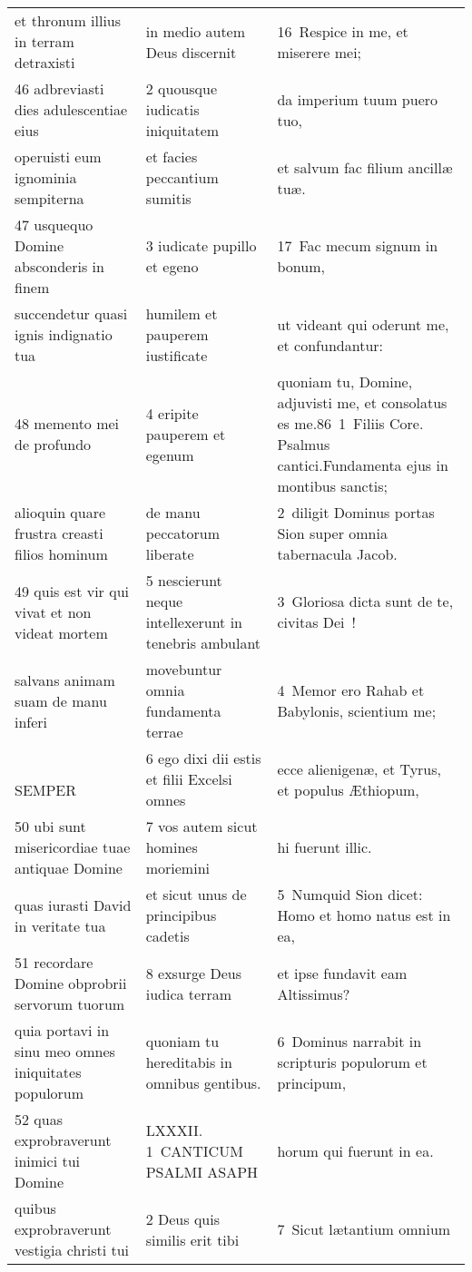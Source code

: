 \documentclass{article}
\begin{document}
\begin{longtable}{@{}p{}p{}p{}@{}}
et thronum illius in terram detraxisti	&	in medio autem Deus discernit	&	16 Respice in me, et miserere mei;	\\
46 adbreviasti dies adulescentiae eius	&	2 quousque iudicatis iniquitatem	&	da imperium tuum puero tuo,	\\
operuisti eum ignominia sempiterna	&	et facies peccantium sumitis	&	et salvum fac filium ancillæ tuæ.	\\
47 usquequo Domine absconderis in finem	&	3 iudicate pupillo et egeno	&	17 Fac mecum signum in bonum,	\\
succendetur quasi ignis indignatio tua	&	humilem et pauperem iustificate	&	ut videant qui oderunt me, et confundantur:	\\
48 memento mei de profundo	&	4 eripite pauperem et egenum	&	quoniam tu, Domine, adjuvisti me, et consolatus es me.86 1 Filiis Core. Psalmus cantici.Fundamenta ejus in montibus sanctis;	\\
alioquin quare frustra creasti filios hominum	&	de manu peccatorum liberate	&	2 diligit Dominus portas Sion super omnia tabernacula Jacob.	\\
49 quis est vir qui vivat et non videat mortem	&	5 nescierunt neque intellexerunt in tenebris ambulant	&	3 Gloriosa dicta sunt de te, civitas Dei !	\\
salvans animam suam de manu inferi	&	movebuntur omnia fundamenta terrae	&	4 Memor ero Rahab et Babylonis, scientium me;	\\
    SEMPER	&	6 ego dixi dii estis et filii Excelsi omnes	&	ecce alienigenæ, et Tyrus, et populus Æthiopum,	\\
50 ubi sunt misericordiae tuae antiquae Domine	&	7 vos autem sicut homines moriemini	&	hi fuerunt illic.	\\
quas iurasti David in veritate tua	&	et sicut unus de principibus cadetis	&	5 Numquid Sion dicet: Homo et homo natus est in ea,	\\
51 recordare Domine obprobrii servorum tuorum	&	8 exsurge Deus iudica terram	&	et ipse fundavit eam Altissimus?	\\
quia portavi in sinu meo omnes iniquitates populorum	&	quoniam tu hereditabis in omnibus gentibus.	&	6 Dominus narrabit in scripturis populorum et principum,	\\
52 quas exprobraverunt inimici tui Domine	&	LXXXII. 1 CANTICUM PSALMI ASAPH	&	horum qui fuerunt in ea.	\\
quibus exprobraverunt vestigia christi tui	&	2 Deus quis similis erit tibi	&	7 Sicut lætantium omnium	\\

\end{longtable}
\end{document}
